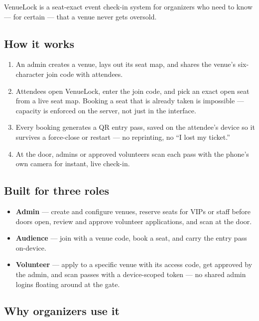 \documentclass[11pt,a4paper]{article}
\begin{document}
VenueLock is a seat-exact event check-in system for organizers who need to
know --- for certain --- that a venue never gets oversold.

\subsection{How it works}

\begin{enumerate}[leftmargin=1.8em]
    \item An admin creates a venue, lays out its seat map, and shares the
        venue's six-character join code with attendees.
    \item Attendees open VenueLock, enter the join code, and pick an exact
        open seat from a live seat map. Booking a seat that is already taken
        is impossible --- capacity is enforced on the server, not just in
        the interface.
    \item Every booking generates a QR entry pass, saved on the attendee's
        device so it survives a force-close or restart --- no reprinting, no
        ``I lost my ticket.''
    \item At the door, admins or approved volunteers scan each pass with the
        phone's own camera for instant, live check-in.
\end{enumerate}

\subsection{Built for three roles}

\begin{itemize}[leftmargin=1.5em]
    \item \textbf{Admin} --- create and configure venues, reserve seats for
        VIPs or staff before doors open, review and approve volunteer
        applications, and scan at the door.
    \item \textbf{Audience} --- join with a venue code, book a seat, and
        carry the entry pass on-device.
    \item \textbf{Volunteer} --- apply to a specific venue with its access
        code, get approved by the admin, and scan passes with a
        device-scoped token --- no shared admin logins floating around at
        the gate.
\end{itemize}

\subsection{Why organizers use it}
\end{document}
